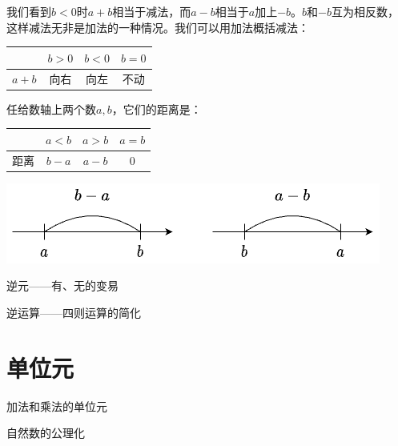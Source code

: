 \documentclass[b5paper]{ctexart}
\begin{document}
我们看到$b < 0$时$a + b$相当于减法，而$a - b$相当于$a$加上$-b$。$b$和$-b$互为相反数，这样减法无非是加法的一种情况。我们可以用加法概括减法：

\begin{center}
\begin{tabular}{c|c|c|c}
        & $b > 0$ & $b < 0$ & $b = 0$ \\
\hline
$a + b$ & 向右     & 向左    & 不动
\end{tabular}
\end{center}

任给数轴上两个数$a, b$，它们的距离是：

\begin{multicols}{2}
  \begin{tabular}{c|c|c|c}
      & $a < b$ & $a > b$ & $a = b$ \\
  \hline
  距离 & $b - a$ & $a - b$ & $0$
  \end{tabular}

 \includegraphics[scale=0.35]{img/distance}
\end{multicols}

逆元——有、无的变易

逆运算——四则运算的简化

\section{单位元}

加法和乘法的单位元

自然数的公理化

\begin{Exercise}[label={ex:zero}]
\end{Exercise}

\begin{Answer}[ref={ex:zero}]
\end{Answer}
\end{document}
